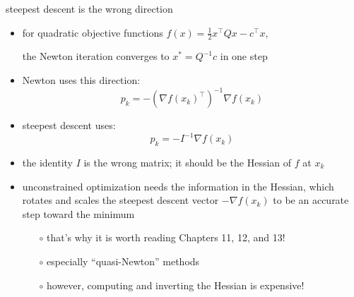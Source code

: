 \documentclass[10pt,hyperref]{beamer}
\newcommand{\grad}{\nabla}
\begin{document}
\begin{frame}{steepest descent is the wrong direction}

\begin{itemize}
\item for quadratic objective functions $f(x)=\frac{1}{2} x^\top Q x - c^\top x$,

\centerline{\alert{the Newton iteration converges to $x^*=Q^{-1}c$ in one step}}

\bigskip
\item Newton uses this direction:
    $$p_k = - \left(\grad f(x_k)^\top\right)^{-1} \grad f(x_k)$$
\item steepest descent uses:
    $$p_k = - I^{-1} \grad f(x_k)$$
\item \alert{the identity $I$ is the wrong matrix; it should be the Hessian of $f$ at $x_k$}

\bigskip
\item unconstrained optimization \alert{needs the information in the Hessian}, which rotates and scales the steepest descent vector $-\grad f(x_k)$ to be an accurate step toward the minimum
    \begin{itemize}
    \item[$\circ$] that's why it is worth reading Chapters 11, 12, and 13!
    \item[$\circ$] especially ``quasi-Newton'' methods
    \item[$\circ$] however, computing and inverting the Hessian is expensive!
    \end{itemize}
\end{itemize}
\end{frame}
\end{document}
